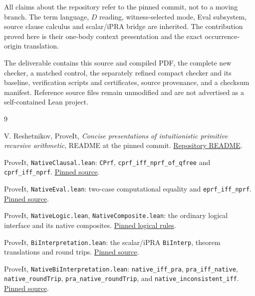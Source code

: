\documentclass[11pt]{article}
\theoremstyle{definition}
\theoremstyle{remark}
\begin{document}
All claims about the repository refer to the pinned commit, not to a
moving branch. The term language, $D$ reading, witness-selected mode,
Eval subsystem, source clause calculus and scalar/iPRA bridge are
inherited. The contribution proved here is their one-body context
presentation and the exact occurrence-origin translation.

The deliverable contains this source and compiled PDF, the complete new
checker, a matched control, the separately refined compact checker and
its baseline, verification scripts and certificates, source provenance,
and a checksum manifest. Reference source files remain unmodified and
are not advertised as a self-contained Lean project.

\begin{thebibliography}{9}
\raggedright
{}
V. Reshetnikov, ProveIt, \emph{Concise presentations of intuitionistic
primitive recursive arithmetic}, README at the pinned commit.
\href{https://github.com/VladimirReshetnikov/ProveIt/blob/11814771b7490dfbea0ed5fcf0f5b23586334764/Logic/PrimitiveRecursiveArithmetic/ConciseIPRA/README.md}{Repository README}.

ProveIt, \texttt{NativeClausal.lean}: \texttt{CPrf},
\texttt{cprf\_iff\_nprf\_of\_qfree} and
\texttt{cprf\_iff\_nprf}.
\href{https://github.com/VladimirReshetnikov/ProveIt/blob/11814771b7490dfbea0ed5fcf0f5b23586334764/Logic/PrimitiveRecursiveArithmetic/ConciseIPRA/Lean/ConciseIPRA/NativeClausal.lean}{Pinned source}.

ProveIt, \texttt{NativeEval.lean}: two-case computational equality and
\texttt{eprf\_iff\_nprf}.
\href{https://github.com/VladimirReshetnikov/ProveIt/blob/11814771b7490dfbea0ed5fcf0f5b23586334764/Logic/PrimitiveRecursiveArithmetic/ConciseIPRA/Lean/ConciseIPRA/NativeEval.lean}{Pinned source}.

ProveIt, \texttt{NativeLogic.lean}, \texttt{NativeComposite.lean}:
the ordinary logical interface and its native composites.
\href{https://github.com/VladimirReshetnikov/ProveIt/blob/11814771b7490dfbea0ed5fcf0f5b23586334764/Logic/PrimitiveRecursiveArithmetic/ConciseIPRA/Lean/ConciseIPRA/NativeLogic.lean}{Pinned logical rules}.

ProveIt, \texttt{BiInterpretation.lean}: the scalar/iPRA
\texttt{BiInterp}, theorem translations and round trips.
\href{https://github.com/VladimirReshetnikov/ProveIt/blob/11814771b7490dfbea0ed5fcf0f5b23586334764/Logic/PrimitiveRecursiveArithmetic/ConciseIPRA/Lean/ConciseIPRA/BiInterpretation.lean}{Pinned source}.

ProveIt, \texttt{NativeBiInterpretation.lean}:
\texttt{native\_iff\_pra}, \texttt{pra\_iff\_native},
\texttt{native\_roundTrip}, \texttt{pra\_native\_roundTrip}, and
\texttt{native\_inconsistent\_iff}.
\href{https://github.com/VladimirReshetnikov/ProveIt/blob/11814771b7490dfbea0ed5fcf0f5b23586334764/Logic/PrimitiveRecursiveArithmetic/ConciseIPRA/Lean/ConciseIPRA/NativeBiInterpretation.lean}{Pinned source}.
\end{thebibliography}
\end{document}
